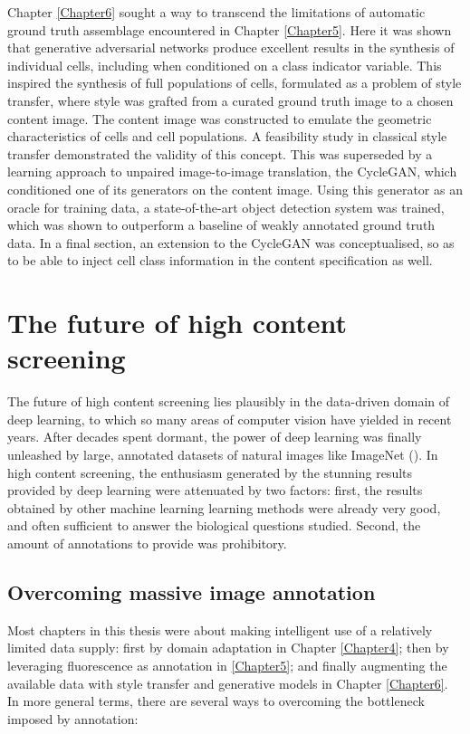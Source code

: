 Chapter \ref{Chapter6} sought a way to transcend the limitations of automatic ground truth assemblage encountered in Chapter \ref{Chapter5}. Here it was shown that generative adversarial networks produce excellent results in the synthesis of individual cells, including when conditioned on a class indicator variable. This inspired the synthesis of full populations of cells, formulated as a problem of style transfer, where style was grafted from a curated ground truth image to a chosen content image. The content image was constructed to emulate the geometric characteristics of cells and cell populations. A feasibility study in classical style transfer demonstrated the validity of this concept. This was superseded by a learning approach to unpaired image-to-image translation, the CycleGAN, which conditioned one of its generators on the content image. Using this generator as an oracle for training data, a state-of-the-art object detection system was trained, which was shown to outperform a baseline of weakly annotated ground truth data. In a final section, an extension to the CycleGAN was conceptualised, so as to be able to inject cell class information in the content specification as well.

\section{The future of high content screening}

The future of high content screening lies plausibly in the data-driven domain of deep learning, to which so many areas of computer vision have yielded in recent years. After decades spent dormant, the power of deep learning was finally unleashed by large, annotated datasets of natural images like ImageNet (\cite{russakovsky2015imagenet}). In high content screening, the enthusiasm generated by the stunning results provided by deep learning were attenuated by two factors: first, the results obtained by other machine learning learning methods were already very good, and often sufficient to answer the biological questions studied. Second, the amount of annotations to provide was prohibitory.

\subsection{Overcoming massive image annotation}

Most chapters in this thesis were about making intelligent use of a relatively limited data supply: first by domain adaptation in Chapter \ref{Chapter4}; then by leveraging fluorescence as annotation in \ref{Chapter5}; and finally augmenting the available data with style transfer and generative models in Chapter \ref{Chapter6}. In more general terms, there are several ways to overcoming the bottleneck imposed by annotation:

